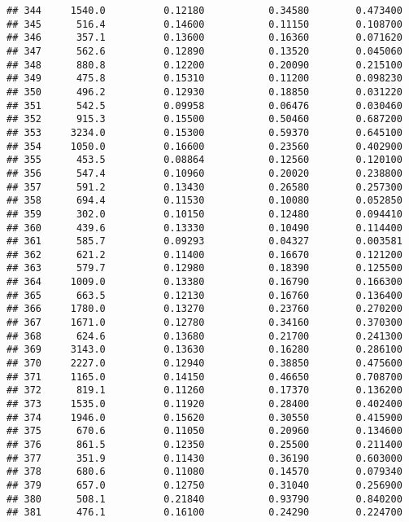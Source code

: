 \documentclass[
]{article}
\begin{document}
\begin{verbatim}
## 344     1540.0          0.12180           0.34580        0.473400
## 345      516.4          0.14600           0.11150        0.108700
## 346      357.1          0.13600           0.16360        0.071620
## 347      562.6          0.12890           0.13520        0.045060
## 348      880.8          0.12200           0.20090        0.215100
## 349      475.8          0.15310           0.11200        0.098230
## 350      496.2          0.12930           0.18850        0.031220
## 351      542.5          0.09958           0.06476        0.030460
## 352      915.3          0.15500           0.50460        0.687200
## 353     3234.0          0.15300           0.59370        0.645100
## 354     1050.0          0.16600           0.23560        0.402900
## 355      453.5          0.08864           0.12560        0.120100
## 356      547.4          0.10960           0.20020        0.238800
## 357      591.2          0.13430           0.26580        0.257300
## 358      694.4          0.11530           0.10080        0.052850
## 359      302.0          0.10150           0.12480        0.094410
## 360      439.6          0.13330           0.10490        0.114400
## 361      585.7          0.09293           0.04327        0.003581
## 362      621.2          0.11400           0.16670        0.121200
## 363      579.7          0.12980           0.18390        0.125500
## 364     1009.0          0.13380           0.16790        0.166300
## 365      663.5          0.12130           0.16760        0.136400
## 366     1780.0          0.13270           0.23760        0.270200
## 367     1671.0          0.12780           0.34160        0.370300
## 368      624.6          0.13680           0.21700        0.241300
## 369     3143.0          0.13630           0.16280        0.286100
## 370     2227.0          0.12940           0.38850        0.475600
## 371     1165.0          0.14150           0.46650        0.708700
## 372      819.1          0.11260           0.17370        0.136200
## 373     1535.0          0.11920           0.28400        0.402400
## 374     1946.0          0.15620           0.30550        0.415900
## 375      670.6          0.11050           0.20960        0.134600
## 376      861.5          0.12350           0.25500        0.211400
## 377      351.9          0.11430           0.36190        0.603000
## 378      680.6          0.11080           0.14570        0.079340
## 379      657.0          0.12750           0.31040        0.256900
## 380      508.1          0.21840           0.93790        0.840200
## 381      476.1          0.16100           0.24290        0.224700

\end{verbatim}
\end{document}
